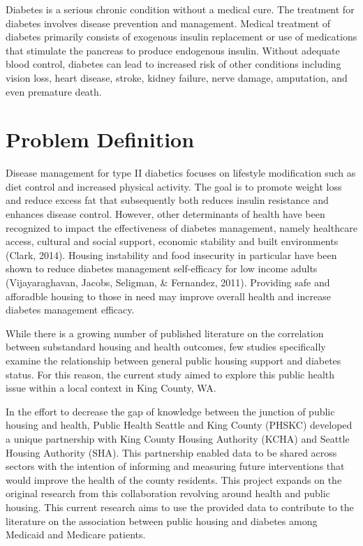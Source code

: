 \documentclass [11pt, proquest] {uwthesis}[2015/03/03]
\begin{document}
Diabetes is a serious chronic condition without a medical cure. The
treatment for diabetes involves disease prevention and management.
Medical treatment of diabetes primarily consists of exogenous insulin
replacement or use of medications that stimulate the pancreas to produce
endogenous insulin. Without adequate blood control, diabetes can lead to
increased risk of other conditions including vision loss, heart disease,
stroke, kidney failure, nerve damage, amputation, and even premature
death.

\section{Problem Definition}\label{problem-definition}

Disease management for type II diabetics focuses on lifestyle
modification such as diet control and increased physical activity. The
goal is to promote weight loss and reduce excess fat that subsequently
both reduces insulin resistance and enhances disease control. However,
other determinants of health have been recognized to impact the
effectiveness of diabetes management, namely healthcare access, cultural
and social support, economic stability and built environments (Clark,
2014). Housing instability and food insecurity in particular have been
shown to reduce diabetes management self-efficacy for low income adults
(Vijayaraghavan, Jacobs, Seligman, \& Fernandez, 2011). Providing safe
and afforadble housing to those in need may improve overall health and
increase diabetes management efficacy.

While there is a growing number of published literature on the
correlation between substandard housing and health outcomes, few studies
specifically examine the relationship between general public housing
support and diabetes status. For this reason, the current study aimed to
explore this public health issue within a local context in King County,
WA.

In the effort to decrease the gap of knowledge between the junction of
public housing and health, Public Health Seattle and King County (PHSKC)
developed a unique partnership with King County Housing Authority (KCHA)
and Seattle Housing Authority (SHA). This partnership enabled data to be
shared across sectors with the intention of informing and measuring
future interventions that would improve the health of the county
residents. This project expands on the original research from this
collaboration revolving around health and public housing. This current
research aims to use the provided data to contribute to the literature
on the association between public housing and diabetes among Medicaid
and Medicare patients.
\end{document}
